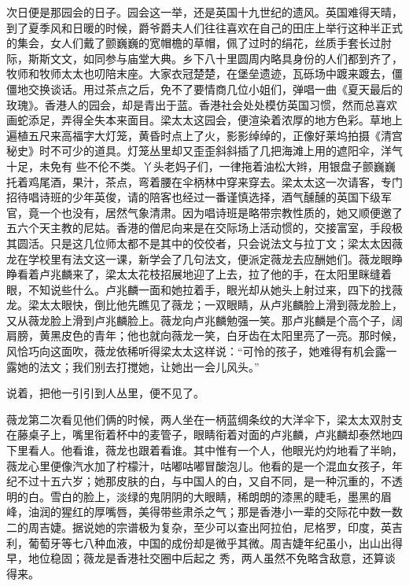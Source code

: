 \documentclass{article}
\begin{document}
次日便是那园会的日子。园会这一举，还是英国十九世纪的遗风。英国难得天晴，到了夏季风和日暖的时候，爵爷爵夫人们往往喜欢在自己的田庄上举行这种半正式的集会，女人们戴了颤巍巍的宽帽檐的草帽，佩了过时的绢花，丝质手套长过肘际，斯斯文文，如同参与庙堂大典。乡下八十里圆周内略具身份的人们都到齐了，牧师和牧师太太也叨陪末座。大家衣冠楚楚，在堡垒遗迹，瓦砾场中踱来踱去，僵僵地交换谈话。用过茶点之后，免不了要情商几位小姐们，弹唱一曲《夏天最后的玫瑰》。香港人的园会，却是青出于蓝。香港社会处处模仿英国习惯，然而总喜欢画蛇添足，弄得全失本来面目。梁太太这园会，便渲染着浓厚的地方色彩。草地上遍植五尺来高福字大灯笼，黄昏时点上了火，影影绰绰的，正像好莱坞拍摄《清宫秘史》时不可少的道具。灯笼丛里却又歪歪斜斜插了几把海滩上用的遮阳伞，洋气十足，未免有
\newpage
些不伦不类。丫头老妈子们，一律拖着油松大辫，用银盘子颤巍巍托着鸡尾酒，果汁，茶点，弯着腰在伞柄林中穿来穿去。梁太太这一次请客，专门招待唱诗班的少年英俊，请的陪客也经过一番谨慎选择，酒气醺醺的英国下级军官，竟一个也没有，居然气象清肃。因为唱诗班是略带宗教性质的，她又顺便邀了五六个天主教的尼姑。香港的僧尼向来是在交际场上活动惯的，交接富室，手段极其圆活。只是这几位师太都不是其中的佼佼者，只会说法文与拉丁文；梁太太因薇龙在学校里有法文这一课，新学会了几句法文，便派定薇龙去应酬她们。薇龙眼睁睁看着卢兆麟来了，梁太太花枝招展地迎了上去，拉了他的手，在太阳里眯缝着眼，不知说些什么。卢兆麟一面和她拉着手，眼光却从她头上射过来，四下的找薇龙。梁太太眼快，倒比他先瞧见了薇龙；一双眼睛，从卢兆麟脸上滑到薇龙脸上，又从薇龙脸上滑到卢兆麟脸上。薇龙向卢兆麟勉强一笑。那卢兆麟是个高个子，阔肩膀，黄黑皮色的青年；他也就向薇龙一笑，白牙齿在太阳里亮了一亮。那时候，风恰巧向这面吹，薇龙依稀听得梁太太这样说：“可怜的孩子，她难得有机会露一露她的法文；我们别去打搅她，让她出一会儿风头。”
\newpage

说着，把他一引引到人丛里，便不见了。 

薇龙第二次看见他们俩的时候，两人坐在一柄蓝绸条纹的大洋伞下，梁太太双肘支在藤桌子上，嘴里衔着杯中的麦管子，眼睛衔着对面的卢兆麟，卢兆麟却泰然地四下里看人。他看谁，薇龙也跟着看谁。其中惟有一个人，他眼光灼灼地看了半晌，薇龙心里便像汽水加了柠檬汁，咕嘟咕嘟冒酸泡儿。他看的是一个混血女孩子，年纪不过十五六岁；她那皮肤的白，与中国人的白，又自不同，是一种沉重的，不透明的白。雪白的脸上，淡绿的鬼阴阴的大眼睛，稀朗朗的漆黑的睫毛，墨黑的眉峰，油润的猩红的厚嘴唇，美得带些肃杀之气；那是香港小一辈的交际花中数一数二的周吉婕。据说她的宗谱极为复杂，至少可以查出阿拉伯，尼格罗，印度，英吉利，葡萄牙等七八种血液，中国的成份却是微乎其微。周吉婕年纪虽小，出山出得早，地位稳固；薇龙是香港社交圈中后起之
秀，两人虽然不免略含敌意，还算谈得来。 
\end{document}
